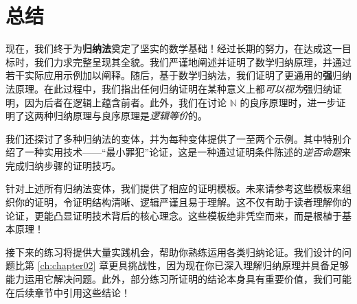\section{总结}

现在，我们终于为\textbf{归纳法}奠定了坚实的数学基础！经过长期的努力，在达成这一目标时，我们力求完整呈现其全貌。我们严谨地阐述并证明了数学归纳原理，并通过若干实际应用示例加以阐释。随后，基于数学归纳法，我们证明了更通用的\textbf{强}归纳法原理。在此过程中，我们指出任何归纳证明在某种意义上都\emph{可以视为}强归纳证明，因为后者在逻辑上蕴含前者。此外，我们在讨论 $\mathbb{N}$ 的良序原理时，进一步证明了这两种归纳原理与良序原理是\emph{逻辑等价}的。

我们还探讨了多种归纳法的变体，并为每种变体提供了一至两个示例。其中特别介绍了一种实用技术——``最小罪犯''论证，这是一种通过证明条件陈述的\emph{逆否命题}来完成归纳步骤的证明技巧。

针对上述所有归纳法变体，我们提供了相应的证明模板。未来请参考这些模板来组织你的证明，令证明结构清晰、逻辑严谨且易于理解。这不仅有助于读者理解你的论证，更能凸显证明技术背后的核心理念。这些模板绝非凭空而来，而是根植于基本原理！

接下来的练习将提供大量实践机会，帮助你熟练运用各类归纳论证。我们设计的问题比第 \ref{ch:chapter02} 章更具挑战性，因为现在你已深入理解归纳原理并具备足够能力运用它解决问题。此外，部分练习所证明的结论本身具有重要价值，我们可能在后续章节中引用这些结论！